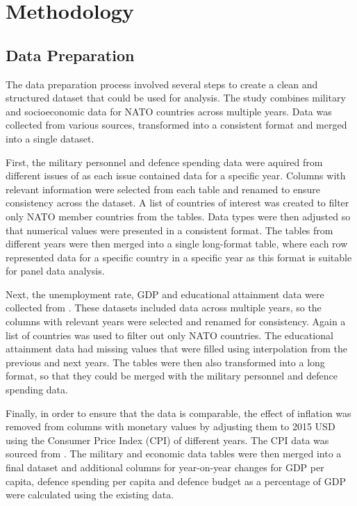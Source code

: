 \chapter{Methodology}

\section{Data Preparation}

The data preparation process involved several steps to create a clean and structured 
dataset that could be used for analysis. The study combines military and socioeconomic 
data for NATO countries across multiple years. Data was collected from various sources,
transformed into a consistent format and merged into a single dataset.

First, the military personnel and defence 
spending data were aquired from different issues of \textcite{noauthor_military_balance_nodate} 
as each issue contained data for a specific year. Columns with relevant information were 
selected from each table and renamed to ensure consistency across the dataset. A list of 
countries of interest was created to filter only NATO member countries from the tables.
Data types were then adjusted so that numerical values were presented in a consistent format.
The tables from different years were then merged into a single long-format table, where
each row represented data for a specific country in a specific year as this format is 
suitable for panel data analysis.

Next, the unemployment rate, GDP and educational attainment data were collected from 
\textcite{noauthor_world_bank_nodate}. These datasets included data across multiple years, 
so the columns with relevant years were selected and renamed for consistency. Again a 
list of countries was used to filter out only NATO countries. The educational attainment 
data had missing values that were filled using interpolation from the previous and next 
years. The tables were then also transformed into a long format, so that they could be 
merged with the military personnel and defence spending data.

Finally, in order to ensure that the data is comparable, the effect of inflation was removed 
from columns with monetary values by adjusting them to 2015 USD using the Consumer Price 
Index (CPI) of different years. The CPI data was sourced from \textcite{federal_reserve_bank_of_minneapolis_consumer_nodate}. 
The military and economic data tables were then merged into a final dataset and additional 
columns for year-on-year changes for GDP per capita, defence spending per capita  
and defence budget as a percentage of GDP were calculated using the existing data.

